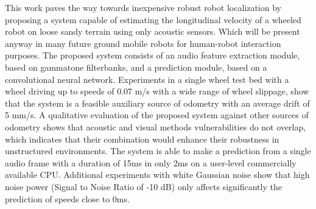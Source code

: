 This work paves the way towards inexpensive robust robot localization by
proposing a system capable of estimating the longitudinal velocity of a wheeled
robot on loose sandy terrain using only acoustic sensors. Which will be present
anyway in many future ground mobile robots for human-robot interaction
purposes. The proposed system consists of an audio feature extraction module,
based on gammatone filterbanks, and a prediction module, based on a
convolutional neural network. Experiments in a single wheel test bed with a
wheel driving up to speeds of 0.07 m/s with a wide range of wheel slippage,
show that the system is a feasible auxiliary source of odometry with an average
drift of 5 mm/s. A qualitative evaluation of the proposed system against other
sources of odometry shows that acoustic and visual methods vulnerabilities do
not overlap, which indicates that their combination would enhance their
robustness in unstructured environments. The system is able to make a
prediction from a single audio frame with a duration of 15ms in only 2ms on a
user-level commercially available CPU. Additional experiments with white
Gaussian noise show that high noise power (Signal to Noise Ratio of -10 dB)
only affects significantly the prediction of speeds close to 0ms.